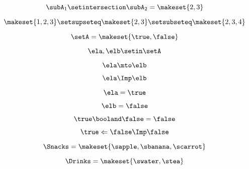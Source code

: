 {\begin{forslides}
    \begin{equation}
        \label{eq:feedback-029}
        \subA_1 \setintersection \subA_2 = \makeset{2, 3 }
    \end{equation}

    \begin{equation}
        \label{eq:feedback-030}
        \makeset{ 1, 2, 3 } \setsupseteq \makeset{2, 3 } \setsubseteq \makeset{2, 3, 4 }
    \end{equation}

    \begin{equation}
        \label{eq:feedback-031}
        \setA = \makeset{ \true, \false }
    \end{equation}

    \begin{equation}
        \label{eq:feedback-032}
        \ela, \elb  \setin \setA
    \end{equation}

    \begin{equation}
        \label{eq:feedback-033}
        \ela \mto \elb
    \end{equation}

    \begin{equation}
        \label{eq:feedback-034}
        \ela \Imp \elb
    \end{equation}

    \begin{equation}
        \label{eq:feedback-035}
        \ela = \true
    \end{equation}

    \begin{equation}
        \label{eq:feedback-036}
        \elb= \false
    \end{equation}

    \begin{equation}
        \label{eq:feedback-037}
        \true \booland \false = \false
    \end{equation}

    \begin{equation}
        \label{eq:feedback-038}
        \true \Leftarrow \false \Imp \false
    \end{equation}

    \begin{equation}
        \label{eq:feedback-039}
        \Snacks=\makeset{\sapple,\sbanana,\scarrot}
    \end{equation}

    \begin{equation}
        \label{eq:feedback-040}
        \Drinks=\makeset{\swater,\stea}
    \end{equation}


\end{forslides}}
